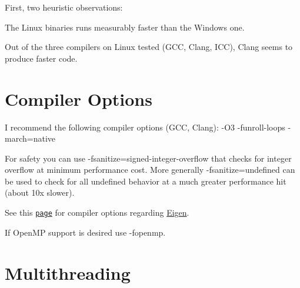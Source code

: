 First, two heuristic observations\+:


\begin{DoxyItemize}
\item The Linux binaries runs measurably faster than the Windows one.
\item Out of the three compilers on Linux tested (G\+CC, Clang, I\+CC), Clang seems to produce faster code.
\end{DoxyItemize}\hypertarget{perf_compoptions}{}\section{Compiler Options}\label{perf_compoptions}

\begin{DoxyItemize}
\item I recommend the following compiler options (G\+CC, Clang)\+: {\ttfamily -\/\+O3 -\/funroll-\/loops -\/march=native }
\item For safety you can use -\/fsanitize=signed-\/integer-\/overflow that checks for integer overflow at minimum performance cost. More generally -\/fsanitize=undefined can be used to check for all undefined behavior at a much greater performance hit (about 10x slower).
\item See this \href{ http://eigen.tuxfamily.org/index.php?title=Main_Page#Compiler_support}{\tt page} for compiler options regarding \hyperlink{namespaceEigen}{Eigen}.
\item If Open\+MP support is desired use {\ttfamily -\/fopenmp}.
\end{DoxyItemize}\hypertarget{perf_thread}{}\section{Multithreading}\label{perf_thread}


